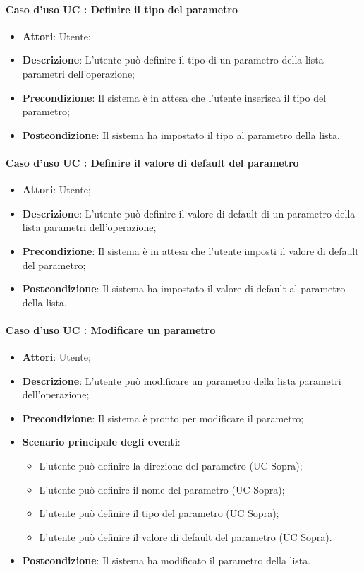 \documentclass[../AnalisiDeiRequisiti.tex]{subfiles}
\begin{document}
		\paragraph{Caso d'uso UC : Definire il tipo del parametro}
			\begin{itemize}
				\item \textbf{Attori}: Utente;
				\item \textbf{Descrizione}: L'utente può definire il tipo di un parametro
				della lista parametri dell'operazione;
				\item \textbf{Precondizione}: Il sistema è in attesa che l'utente inserisca
				il tipo del parametro;
				\item \textbf{Postcondizione}: Il sistema ha impostato il tipo al parametro
				della lista.
			\end{itemize}
		\paragraph{Caso d'uso UC : Definire il valore di default del parametro}
			\begin{itemize}
				\item \textbf{Attori}: Utente;
				\item \textbf{Descrizione}: L'utente può definire il valore di default di un
				parametro della lista parametri dell'operazione;
				\item \textbf{Precondizione}: Il sistema è in attesa che l'utente imposti
				il valore di default del parametro;
				\item \textbf{Postcondizione}: Il sistema ha impostato il valore di default al
				parametro della lista.
			\end{itemize}
		\paragraph{Caso d'uso UC : Modificare un parametro}
			\begin{itemize}
				\item \textbf{Attori}: Utente;
				\item \textbf{Descrizione}: L'utente può modificare un parametro della lista
				parametri dell'operazione;
				\item \textbf{Precondizione}: Il sistema è pronto per modificare il parametro;
				\item \textbf{Scenario principale degli eventi}:
					\begin{itemize}
						\item L'utente può definire la direzione del parametro (UC Sopra);
						\item L'utente può definire il nome del parametro (UC Sopra);
						\item L'utente può definire il tipo del parametro (UC Sopra);
						\item L'utente può definire il valore di default del parametro (UC Sopra).
					\end{itemize}
				\item \textbf{Postcondizione}: Il sistema ha modificato il parametro della
				lista.
			\end{itemize}
\end{document}
